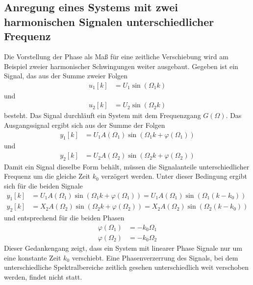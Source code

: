 \subsection{\texorpdfstring{Anregung eines Systems mit zwei harmonischen Signalen unterschiedlicher Frequenz }{Anregung eines Systems mit zwei harmonischen Signalen unterschiedlicher Frequenz }}\label{anregung-eines-systems-mit-zwei-harmonischen-signalen-unterschiedlicher-frequenz}

Die Vorstellung der Phase als Maß für eine zeitliche Verschiebung wird am Beispiel zweier harmonischer Schwingungen weiter ausgebaut. Gegeben ist ein Signal, das aus der Summe zweier Folgen
\begin{align}
u_{1}[ k] &= U_{1}  \sin\left( \Omega_{1}  k \right) \label{eq:8.69}
\end{align}
und
\begin{align}
u_{2}[ k] &= U_{2}  \sin\left( \Omega_{2}  k \right) \label{eq:8.70}
\end{align}
besteht. Das Signal durchläuft ein System mit dem Frequenzgang \(G(Ω)\). Das Ausgangssignal ergibt sich aus der Summe der Folgen
\begin{align}
y_{1}[ k] &= U_{1}  A\left( \Omega_{1} \right)  \sin\left( \Omega_{1}  k + \varphi\left( \Omega_{1} \right) \right) \label{eq:8.71}
\end{align}
und
\begin{align}
y_{2}[ k] &= U_{2}  A\left( \Omega_{2} \right)  \sin\left( \Omega_{2}  k + \varphi\left( \Omega_{2} \right) \right) \label{eq:8.72}
\end{align}
Damit ein Signal dieselbe Form behält, müssen die Signalanteile unterschiedlicher Frequenz um die gleiche Zeit \(k_{0}\) verzögert werden. Unter dieser Bedingung ergibt sich für die beiden Signale
\begin{align}
y_{1}[ k] &= U_{1}  A\left( \Omega_{1} \right)\sin\left( \Omega_{1}  k + \varphi\left( \Omega_{1} \right) \right) = U_{1}  A\left( \Omega_{1} \right)  \sin\left( \Omega_{1}  \left( k - k_{0} \right) \right) \label{eq:8.73} \\
y_{2}[ k] &= X_{2}  A\left( \Omega_{2} \right)  \sin\left( \Omega_{2}  k + \varphi\left( \Omega_{2} \right) \right) = X_{2}  A\left( \Omega_{2} \right)  \sin\left( \Omega_{2}  \left( k - k_{0} \right) \right) \label{eq:8.74}
\end{align}
und entsprechend für die beiden Phasen
\begin{align}
\varphi\left( \Omega_{1} \right) &= - k_{0}  \Omega_{1} \label{eq:8.75} \\
\varphi\left( \Omega_{2} \right) &= - k_{0}  \Omega_{2} \label{eq:8.76}
\end{align}
Dieser Gedankengang zeigt, dass ein System mit linearer Phase Signale nur um eine konstante Zeit \(k_{0}\) verschiebt. Eine Phasenverzerrung des Signals, bei dem unterschiedliche Spektralbereiche zeitlich gesehen unterschiedlich weit verschoben werden, findet nicht statt.

